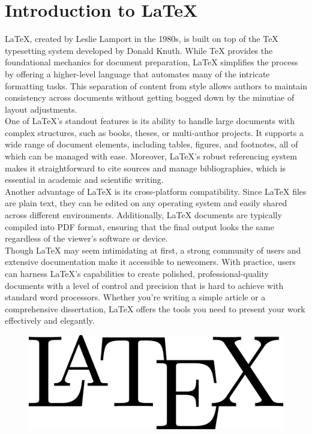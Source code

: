\documentclass[12pt, a4paper]{article}
\begin{document}
\newpage


\centering
\section*{Introduction to LaTeX}
\vspace{2cm}
LaTeX, created by Leslie Lamport in the 1980s, is built on top of the TeX typesetting system developed by Donald Knuth. While TeX provides the foundational mechanics for document preparation, LaTeX simplifies the process by offering a higher-level language that automates many of the intricate formatting tasks. This separation of content from style allows authors to maintain consistency across documents without getting bogged down by the minutiae of layout adjustments. \\
\vspace{0.3cm}
One of LaTeX's standout features is its ability to handle large documents with complex structures, such as books, theses, or multi-author projects. It supports a wide range of document elements, including tables, figures, and footnotes, all of which can be managed with ease. Moreover, LaTeX's robust referencing system makes it straightforward to cite sources and manage bibliographies, which is essential in academic and scientific writing.\\
\vspace{0.3cm}
Another advantage of LaTeX is its cross-platform compatibility. Since LaTeX files are plain text, they can be edited on any operating system and easily shared across different environments. Additionally, LaTeX documents are typically compiled into PDF format, ensuring that the final output looks the same regardless of the viewer's software or device.\\
\vspace{0.3cm}
Though LaTeX may seem intimidating at first, a strong community of users and extensive documentation make it accessible to newcomers. With practice, users can harness LaTeX's capabilities to create polished, professional-quality documents with a level of control and precision that is hard to achieve with standard word processors. Whether you're writing a simple article or a comprehensive dissertation, LaTeX offers the tools you need to present your work effectively and elegantly.

\begin{figure}
    \centering
    \includegraphics[width=0.3\linewidth]{latex.png}
\end{figure}
\end{document}
